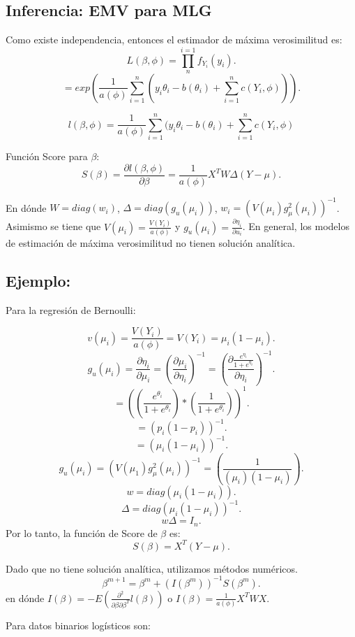 \documentclass{article}
\begin{document}
\subsection{Inferencia: EMV para MLG}
Como existe independencia, entonces el estimador de máxima verosimilitud es:
\[ L{(\beta,\phi)}= \prod_{n}^{i=1} f_{Y_{i}}{(y_{i})}.\]
\[ = exp{(\frac{1}{a{(\phi)}} \sum_{i=1}^{n}{(y_{i}\theta_{i}-b{(\theta_{i})}+\sum_{i=1}^{n}c{(Y_{i},\phi)})})}.\]

\[ l{(\beta,\phi)}=\frac{1}{a{(\phi)}} \sum_{i=1}^{n}{(y_{i}\theta_{i}-b{(\theta_{i})}+\sum_{i=1}^{n}c{(Y_{i},\phi)}}\]

Función Score para $\beta$:
\[ S{(\beta)}=\frac{\partial l{(\beta,\phi)}}{\partial \beta}=\frac{1}{a{(\phi)}} X^{T}W\Delta{(Y-\mu)}.\]

En dónde $W=diag{(w_{i})}$, $\Delta=diag{(g_{u}{(\mu_{i})})}$, $w_{i}={(V{(\mu_{i})}g^{2}_{\mu}{(\mu_{i})})}^{-1}$. Asimismo se tiene que $V{(\mu_{i})}=\frac{V{(Y_{i})}}{a{(\phi)}}$ y $g_{u}{(\mu_{i})}=\frac{\partial \eta_{i}}{\partial u_{i}}$. En general, los modelos de estimación de máxima verosimilitud no tienen solución analítica.

\subsection{Ejemplo:}

Para la regresión de Bernoulli:

\[ v{(\mu_{i})}=\frac{V{(Y_{i})}}{a{(\phi)}}=V{(Y_{i})}=\mu_{i}{(1-\mu_{i})}.\]
\[ g_{u}{(\mu_{i})}=\frac{\partial \eta_{i}}{\partial \mu_{i}}= {(\frac{\partial \mu_{i}}{\partial \eta_{i}})}^{-1}={(\frac{\partial \frac{e^{\eta_{i}}}{1+e^{\eta_{i}}}}{\partial \eta_{i}})}^{-1}.\]
\[ ={({(\frac{e^{\theta_{i}}}{1+e^{\theta_{i}}})}*{(\frac{1}{1+e^{\theta_{i}}})})}^{1}.\]
\[ ={(p_{i}{(1-p_{i})})}^{-1}.\]
\[ ={(\mu_{i}{(1-\mu_{i})})}^{-1}.\]
\[ g_{u}{(\mu_{i})}={(V{(\mu_{1})}g_{\mu}^{2}{(\mu_{i})})}^{-1}={(\frac{1}{{(\mu_{i})}{(1-\mu_{i})}})}.\]
\[ w=diag{(\mu_{i}{(1-\mu_{i})})}.\]
\[ \Delta = diag{(\mu_{i}{(1-\mu_{i})})}^{-1}.\]
\[ w\Delta =I_{n}.\]
Por lo tanto, la función de Score de $\beta$ es:
\[ S{(\beta)}=X^{T}{(Y-\mu)}.\]

Dado que no tiene solución analítica, utilizamos métodos numéricos.
\[ \beta^{m+1}=\beta^{m}+{(I{(\beta^{m})})}^{-1}S{(\beta^{m})}.\]
en dónde $I{(\beta)}=-E{(\frac{\partial^{2}}{\partial \beta\partial \beta^{T}}l{(\beta)})}$ o $I{(\beta)}=\frac{1}{a{(\phi)}} X^{T}WX$.

Para datos binarios logísticos son:
\end{document}
